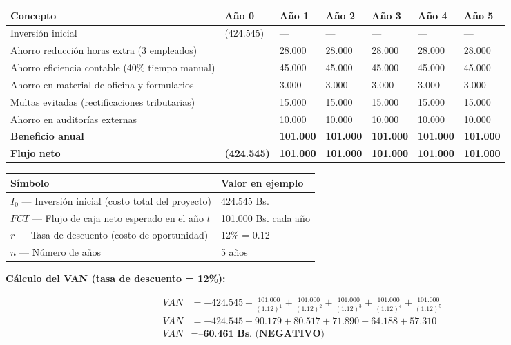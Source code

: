 \documentclass[stu]{apa7}
\begin{document}
\begin{longtable}{|L{4cm}|C{2cm}|C{2cm}|C{2cm}|C{2cm}|C{2cm}|C{2cm}|}
\hline
{}
\textbf{Concepto} & \textbf{Año 0} & \textbf{Año 1} & \textbf{Año 2} & \textbf{Año 3} & \textbf{Año 4} & \textbf{Año 5} \\
\hline
Inversión inicial & (424.545) & --- & --- & --- & --- & --- \\
\hline
Ahorro reducción horas extra (3 empleados) & & 28.000 & 28.000 & 28.000 & 28.000 & 28.000 \\
\hline
Ahorro eficiencia contable (40\% tiempo manual) & & 45.000 & 45.000 & 45.000 & 45.000 & 45.000 \\
\hline
Ahorro en material de oficina y formularios & & 3.000 & 3.000 & 3.000 & 3.000 & 3.000 \\
\hline
Multas evitadas (rectificaciones tributarias) & & 15.000 & 15.000 & 15.000 & 15.000 & 15.000 \\
\hline
Ahorro en auditorías externas & & 10.000 & 10.000 & 10.000 & 10.000 & 10.000 \\
\hline
\textbf{Beneficio anual} & & \textbf{101.000} & \textbf{101.000} & \textbf{101.000} & \textbf{101.000} & \textbf{101.000} \\
\hline
{}
\textbf{Flujo neto} & \textbf{(424.545)} & \textbf{101.000} & \textbf{101.000} & \textbf{101.000} & \textbf{101.000} & \textbf{101.000} \\
\hline
\end{longtable}

\begin{longtable}{|L{5cm}|C{3cm}|}
\hline
{}
\textbf{Símbolo} & \textbf{Valor en ejemplo} \\
\hline
$I_0$ --- Inversión inicial (costo total del proyecto) & 424.545 Bs. \\
\hline
$FCT$ --- Flujo de caja neto esperado en el año $t$ & 101.000 Bs. cada año \\
\hline
$r$ --- Tasa de descuento (costo de oportunidad) & 12\% = 0.12 \\
\hline
$n$ --- Número de años & 5 años \\
\hline
\end{longtable}

\textbf{Cálculo del VAN (tasa de descuento = 12\%):}

\[
\begin{aligned}
VAN &= -424.545 + \frac{101.000}{(1.12)^1} + \frac{101.000}{(1.12)^2} + \frac{101.000}{(1.12)^3} + \frac{101.000}{(1.12)^4} + \frac{101.000}{(1.12)^5} \\
VAN &= -424.545 + 90.179 + 80.517 + 71.890 + 64.188 + 57.310 \\
VAN &= \textbf{--60.461 Bs. (NEGATIVO)}
\end{aligned}
\]
\end{document}
